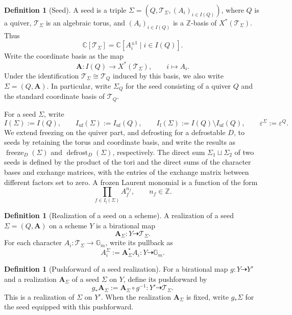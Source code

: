 \documentclass[10pt,a4paper]{article}
\theoremstyle{definition}
\newtheorem{definition}[theorem]{Definition}
\theoremstyle{remark}
\newcommand{\C}{\mathbb C}
\newcommand{\Gm}{\mathbb G_m}
\newcommand{\Tcal}{\mathcal T}
\newcommand{\eps}{\varepsilon}
\begin{document}
\begin{definition}[Seed]
\label{def:seed}
A seed is a triple \(\Sigma=(Q,\Tcal_\Sigma,(A_i)_{i\in I(Q)})\), where \(Q\)
is a quiver, \(\Tcal_\Sigma\) is an algebraic torus, and
\((A_i)_{i\in I(Q)}\) is a \(\mathbb Z\)-basis of
\(X^*(\Tcal_\Sigma)\).  Thus
\[
 \C[\Tcal_\Sigma]
 =
 \C[A_i^{\pm1}\mid i\in I(Q)].
\]
Write the coordinate basis as the map
\[
 \mathbf A:I(Q)\longrightarrow X^*(\Tcal_\Sigma),
 \qquad i\longmapsto A_i.
\]
Under the identification \(\Tcal_\Sigma\cong\Tcal_Q\) induced by this basis,
we also write \(\Sigma=(Q,\mathbf A)\).  In particular, write \(\Sigma_Q\) for
the seed consisting of a quiver \(Q\) and the standard coordinate basis of
\(\Tcal_Q\).
\end{definition}

For a seed \(\Sigma\), write
\[
 I(\Sigma):=I(Q),\qquad
 I_{\mathrm{uf}}(\Sigma):=I_{\mathrm{uf}}(Q),\qquad
 I_{\mathrm f}(\Sigma):=I(Q)\setminus I_{\mathrm{uf}}(Q),
 \qquad \eps^\Sigma:=\eps^Q.
\]
We extend freezing on the quiver part, and defrosting for a defrostable \(D\),
to seeds by retaining the torus and coordinate basis, and write the results as
\(\operatorname{freeze}_D(\Sigma)\) and
\(\operatorname{defrost}_D(\Sigma)\), respectively.  The direct sum
\(\Sigma_1\sqcup\Sigma_2\) of two seeds is defined by the product of the tori
and the direct sums of the character bases and exchange matrices, with the
entries of the exchange matrix between different factors set to zero.  A
frozen Laurent monomial is a function of the form
\[
 \prod_{f\in I_{\mathrm f}(\Sigma)}A_f^{n_f},
 \qquad n_f\in\mathbb Z.
\]

\begin{definition}[Realization of a seed on a scheme]
A realization of a seed \(\Sigma=(Q,\mathbf A)\) on a scheme \(Y\) is a
birational map
\[
 \mathbf A_\Sigma:Y\dashrightarrow\Tcal_\Sigma.
\]
For each character \(A_i:\Tcal_\Sigma\to\Gm\), write its pullback as
\[
 A_i^\Sigma:= \mathbf A_\Sigma^* A_i : Y\dashrightarrow\Gm.
\]
\end{definition}

\begin{definition}[Pushforward of a seed realization]
For a birational map \(g:Y\dashrightarrow Y'\) and a realization
\(\mathbf A_\Sigma\) of a seed \(\Sigma\) on \(Y\), define its pushforward by
\[
 g_*\mathbf A_\Sigma
 :=\mathbf A_\Sigma\circ g^{-1}
 :Y'\dashrightarrow\Tcal_\Sigma.
\]
This is a realization of \(\Sigma\) on \(Y'\).  When the realization
\(\mathbf A_\Sigma\) is fixed, write \(g_*\Sigma\) for the seed equipped with
this pushforward.
\end{definition}
\end{document}
